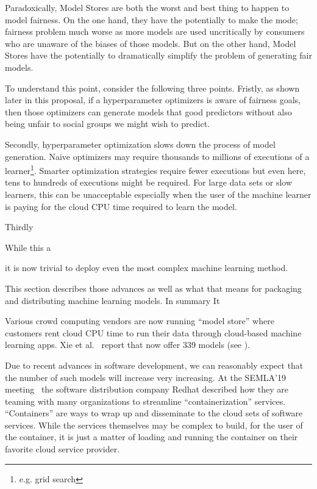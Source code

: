 Paradoxically,   Model Stores are both the worst and best thing to happen to model fairness. On the one hand, they have the potentially to make the mode; fairness problem much worse as more models are used uncritically
by consumers who are unaware of the biases of those models.
But on the other hand, Model Stores have the potentially to dramatically simplify the problem of generating fair models. 

To understand this point, consider the following three points.
Fristly, as shown later in this proposal, if a hyperparameter optimizers
is aware of fairness goals, then those optimizers can generate models
that good predictors without also being unfair to social groups we might wish to predict.

Secondly,  hyperparameter optimization slows down the process of model generation. Naive optimizers may require thousands to millions of executions of a learner\footnote{e.g. grid search}. Smarter optimization strategies require fewer executions but even here, tens to hundreds of executions might be required. For large data sets or slow learners, this can be unacceptable especially when the user of the machine learner is paying for the cloud CPU time required to learn the model. 

Thirdly


While this a
  
it is now trivial to deploy even
the most complex machine learning method. 

This section
describes those advances as well as what that means
for packaging and distributing machine learning models.
In summary 
It 


  Various crowd computing vendors are now running ``model store'' where customers
  rent cloud CPU time to run their data through cloud-based machine learning apps. Xie et al.~\cite{xiu2019exploratory} report that  
  now offer 339 models (see ). 
  
Due to recent advances in software development,
we can reasonably expect that the number of such models will increase very    increasing. At the SEMLA'19 meeting~\cite{semla19}
the software distribution company Redhat described how they are
teaming with many organizations to streamline ``containerization'' services. ``Containers'' are ways to wrap up and disseminate to the cloud sets of software services. While the services themselves may be complex to build, for the user of the container, it is just a matter of loading and running the container on their favorite cloud service provider. 

